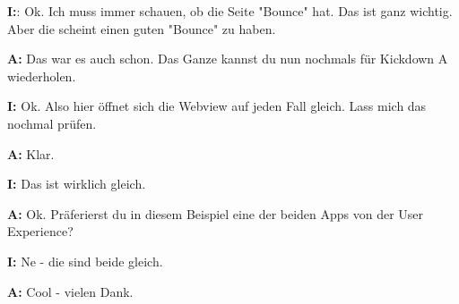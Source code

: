 \begin{myparindent}{0pt}
\textbf{I:}: Ok. Ich muss immer schauen, ob die Seite "Bounce" hat. Das ist ganz wichtig. Aber die scheint einen guten "Bounce" zu haben.

\textbf{A:} Das war es auch schon. Das Ganze kannst du nun nochmals für Kickdown A wiederholen. 

\textbf{I:} Ok. Also hier öffnet sich die Webview auf jeden Fall gleich. Lass mich das nochmal prüfen. 

\textbf{A:} Klar.

\textbf{I:} Das ist wirklich gleich. 

\textbf{A:} Ok. Präferierst du in diesem Beispiel eine der beiden Apps von der User Experience?

\textbf{I:} Ne - die sind beide gleich. 

\textbf{A:} Cool - vielen Dank.

\end{myparindent}